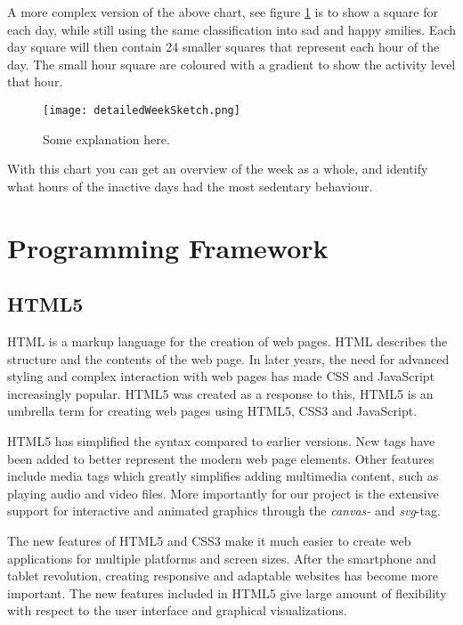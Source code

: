A more complex version of the above chart, see figure \ref{fig:detailedWeek} is to show a square for each day, while still using the same classification into sad and happy smilies. Each day square will then contain 24 smaller squares that represent each hour of the day. The small hour square are coloured with a gradient to show the activity level that hour.

\begin{figure}[h!]
	\centering
		\texttt{[image: detailedWeekSketch.png]}
		\caption{\footnotesize Some explanation here.}
		\label{fig:detailedWeek}
\end{figure}

With this chart you can get an overview of the week as a whole, and identify what hours of the inactive days had the most sedentary behaviour. 

\section{Programming Framework}

\subsection{HTML5}
HTML is a markup language for the creation of web pages. HTML describes the structure and the contents of the web page. In later years, the need for advanced styling and complex interaction with web pages has made CSS and JavaScript increasingly popular. HTML5 was created as a response to this, HTML5 is an umbrella term for creating web pages using HTML5, CSS3 and JavaScript.

HTML5 has simplified the syntax compared to earlier versions. New tags have been added to better represent the modern web page elements. Other features include media tags which greatly simplifies adding multimedia content, such as playing audio and video files. More importantly for our project is the extensive support for interactive and animated graphics through the \emph{canvas-} and \emph{svg}-tag.

The new features of HTML5 and CSS3 make it much easier to create web applications for multiple platforms and screen sizes. After the smartphone and tablet revolution, creating responsive and adaptable websites has become more important. The new features included in HTML5 give large amount of flexibility with respect to the user interface and graphical visualizations.

